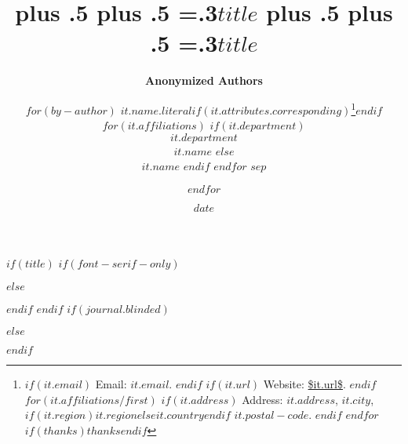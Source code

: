 $if(title)$
$if(font-serif-only)$
\title{\bfseries\huge\parfillskip=0pt
\rightskip=0pt plus .5\textwidth
\leftskip=0pt plus .5\textwidth
\emergencystretch=.3\textwidth $title$}
$else$
\title{\sffamily\bfseries\huge\parfillskip=0pt
\rightskip=0pt plus .5\textwidth
\leftskip=0pt plus .5\textwidth
\emergencystretch=.3\textwidth $title$}
$endif$
$endif$
$if(journal.blinded)$
\author{\textbf{Anonymized Authors}}
$else$
\author{$for(by-author)$
\textbf{$it.name.literal$}$if(it.attributes.corresponding)$\footnote{
$if(it.email)$
Email: \texttt{\href{mailto:$it.email$}{$it.email$}}.
$endif$
$if(it.url)$
Website: \url{$it.url$}.
$endif$
$for(it.affiliations/first)$
$if(it.address)$
Address:
$it.address$, $it.city$, $if(it.region)$$it.region$$else$$it.country$$endif$ $it.postal-code$.
$endif$
$endfor$
$if(thanks)$$thanks$$endif$}$endif$
$for(it.affiliations)$
$if(it.department)$
\\$it.department$\\$it.name$
$else$
\\$it.name$
$endif$
\vspace{0.05in}
$endfor$ $sep$
\and $endfor$}
$endif$
\date{$date$}
